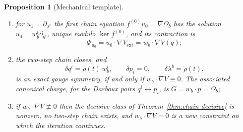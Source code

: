 \documentclass[12pt]{article}
\theoremstyle{plain}
\newtheorem{proposition}[theorem]{Proposition}
\theoremstyle{definition}
\theoremstyle{remark}
\newcommand{\Om}{\Omega}
\begin{document}
\begin{proposition}[Mechanical template]
\begin{enumerate}[label=(\alph*),leftmargin=2.2em,itemsep=0.25em]
\begin{equation}
				\bigl\{(w_{b}^{i}\partial_{q^{i}},-e_{b})\bigr\}_{b=1}^{c},
				\label{eq:templatekerbasis}
			\end{equation}
			the first family being the multiplier-free directions of
			Proposition~\ref{prop:mfree} and the second the candidate chain links;
			\item for $u_{1}=\partial_{\lambda^{b}}$ the first chain equation
			$f^{(0)}u_{0}=\nabla\Om_{b}$ has the solution
			$u_{0}=w_{b}^{i}\partial_{q^{i}}$, unique modulo $\ker f^{(0)}$, and its
			contraction is
			\begin{equation}
				\Phi_{u_{0}}=u_{0}\!\cdot\!\nabla V_{\mathrm{ext}}
				=w_{b}\!\cdot\!\nabla V(q);
				\label{eq:templatePhi}
			\end{equation}
			\item the two-step chain closes, and
			\begin{equation}
				\delta q^{i}=\rho(t)\,w_{b}^{i},
				\qquad
				\delta p_{i}=0,
				\qquad
				\delta\lambda^{b}=\dot\rho(t),
				\label{eq:templatechain}
			\end{equation}
			is an exact gauge symmetry, \emph{if and only if}
			$w_{b}\!\cdot\!\nabla V\equiv0$. The associated canonical charge, for the
			Darboux pairs $q^{i}\leftrightarrow p_{i}$, is
			$G=w_{b}\!\cdot\!p=\Om_{b}$;
			\item if $w_{b}\!\cdot\!\nabla V\not\equiv0$ then the decisive class of
			Theorem~\ref{thm:chain-decisive} is nonzero, no two-step chain exists, and
			$w_{b}\!\cdot\!\nabla V=0$ is a new constraint on which the iteration
			continues.
		\end{enumerate}
	\end{proposition}
	
\end{document}
